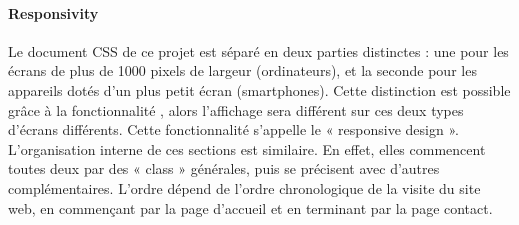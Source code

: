 \documentclass[a4,10pt,french]{sphinxmanual}
\begin{document}
\paragraph{Responsivity}
\label{\detokenize{chapitre-02:responsivity}}
\sphinxAtStartPar
Le document CSS de ce projet est séparé en deux parties distinctes : une pour les écrans de plus de 1000 pixels de largeur (ordinateurs), et la seconde pour les appareils dotés d’un plus petit écran (smartphones). Cette distinction est possible grâce à la fonctionnalité , alors l’affichage sera différent sur ces deux types d’écrans différents. Cette fonctionnalité s’appelle le « responsive design ». L’organisation interne de ces sections est similaire. En effet, elles commencent toutes deux par des « class » générales, puis se précisent avec d’autres  complémentaires. L’ordre dépend de l’ordre chronologique de la visite du site web, en commençant par la page d’accueil et en terminant par la page contact.
\end{document}
